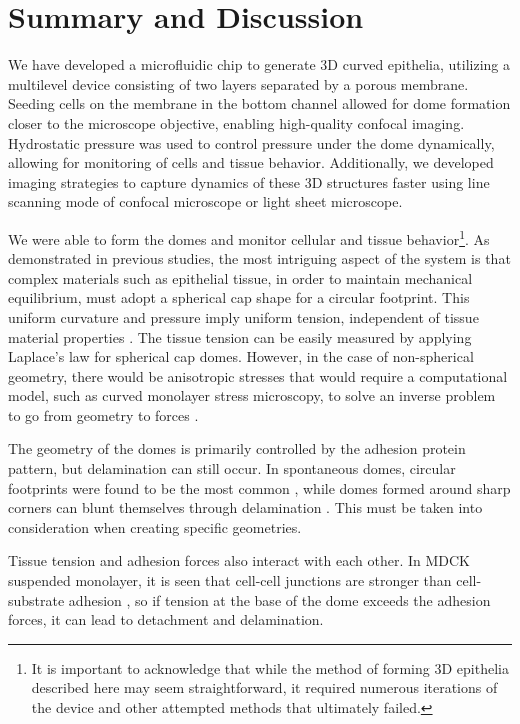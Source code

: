\newpage

\hypertarget{summary-and-discussion}{%
\section{Summary and Discussion}\label{summary-and-discussion}}

We have developed a microfluidic chip to generate 3D curved epithelia, utilizing a multilevel device consisting of two layers separated by a porous membrane. Seeding cells on the membrane in the bottom channel allowed for dome formation closer to the microscope objective, enabling high-quality confocal imaging. Hydrostatic pressure was used to control pressure under the dome dynamically, allowing for monitoring of cells and tissue behavior. Additionally, we developed imaging strategies to capture dynamics of these 3D structures faster using line scanning mode of confocal microscope or light sheet microscope.

We were able to form the domes and monitor cellular and tissue behavior\footnote{It is important to acknowledge that while the method of forming 3D epithelia described here may seem straightforward, it required numerous iterations of the device and other attempted methods that ultimately failed.}. As demonstrated in previous studies, the most intriguing aspect of the system is that complex materials such as epithelial tissue, in order to maintain mechanical equilibrium, must adopt a spherical cap shape for a circular footprint. This uniform curvature and pressure imply uniform tension, independent of tissue material properties  \cite{latorre2018,marin-llaurado2022}. The tissue tension can be easily measured by applying Laplace's law for spherical cap domes. However, in the case of non-spherical geometry, there would be anisotropic stresses that would require a computational model, such as curved monolayer stress microscopy, to solve an inverse problem to go from geometry to forces \cite{marin-llaurado2022}.  

The geometry of the domes is primarily controlled by the adhesion protein pattern, but delamination can still occur. In spontaneous domes, circular footprints were found to be the most common  \cite{tanner1983}, while domes formed around sharp corners can blunt themselves through delamination \cite{latorre2018}. This must be taken into consideration when creating specific geometries.  

Tissue tension and adhesion forces also interact with each other. In MDCK suspended monolayer, it is seen that cell-cell junctions are stronger than cell-substrate adhesion \cite{harris2012}, so if tension at the base of the dome exceeds the adhesion forces, it can lead to detachment and delamination.  

